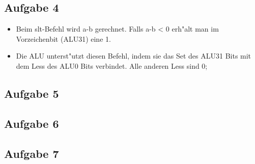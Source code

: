 \documentclass[a4paper,abstracton]{scrartcl}
\begin{document}
\subsection{Aufgabe 4}
\begin{itemize}
	\item Beim slt-Befehl wird a-b gerechnet. Falls a-b < 0 erh"alt man im Vorzeichenbit (ALU31) eine 1.
	\item Die ALU unterst"utzt diesen Befehl, indem sie das Set des ALU31 Bits mit dem Less des ALU0 Bits verbindet. 
	Alle anderen Less sind 0;
\end{itemize}

\subsection{Aufgabe 5}

\subsection{Aufgabe 6}

\subsection{Aufgabe 7}
\end{document}
